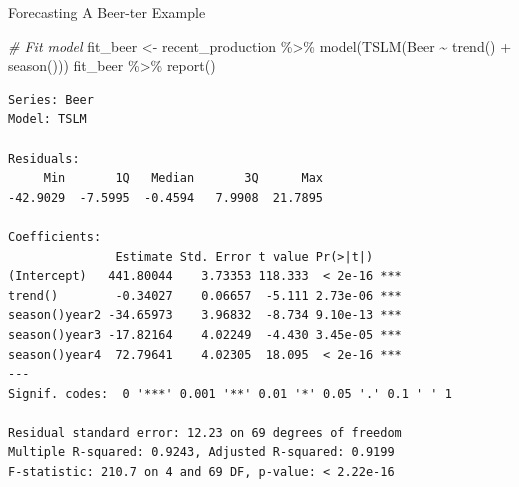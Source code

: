 \documentclass[
  ignorenonframetext,
]{beamer}
\newenvironment{Shaded}{\begin{snugshade}}{\end{snugshade}}
\newcommand{\CommentTok}[1]{\textcolor[rgb]{0.56,0.35,0.01}{\textit{#1}}}
\newcommand{\FunctionTok}[1]{\textcolor[rgb]{0.00,0.00,0.00}{#1}}
\newcommand{\NormalTok}[1]{#1}
\newcommand{\OtherTok}[1]{\textcolor[rgb]{0.56,0.35,0.01}{#1}}
\newcommand{\SpecialCharTok}[1]{\textcolor[rgb]{0.00,0.00,0.00}{#1}}
\begin{document}
\begin{frame}[fragile]{Forecasting \textbar{} \small A Beer-ter Example}
\protect\hypertarget{forecasting-a-beer-ter-example-1}{}
\tiny

\normalfont

\tiny

\begin{Shaded}
\begin{Highlighting}[]
\CommentTok{\# Fit model}
\NormalTok{fit\_beer }\OtherTok{\textless{}{-}}\NormalTok{ recent\_production }\SpecialCharTok{\%\textgreater{}\%} \FunctionTok{model}\NormalTok{(}\FunctionTok{TSLM}\NormalTok{(Beer }\SpecialCharTok{\textasciitilde{}} \FunctionTok{trend}\NormalTok{() }\SpecialCharTok{+} \FunctionTok{season}\NormalTok{()))}
\NormalTok{fit\_beer }\SpecialCharTok{\%\textgreater{}\%} \FunctionTok{report}\NormalTok{()}
\end{Highlighting}
\end{Shaded}

\begin{verbatim}
Series: Beer 
Model: TSLM 

Residuals:
     Min       1Q   Median       3Q      Max 
-42.9029  -7.5995  -0.4594   7.9908  21.7895 

Coefficients:
               Estimate Std. Error t value Pr(>|t|)    
(Intercept)   441.80044    3.73353 118.333  < 2e-16 ***
trend()        -0.34027    0.06657  -5.111 2.73e-06 ***
season()year2 -34.65973    3.96832  -8.734 9.10e-13 ***
season()year3 -17.82164    4.02249  -4.430 3.45e-05 ***
season()year4  72.79641    4.02305  18.095  < 2e-16 ***
---
Signif. codes:  0 '***' 0.001 '**' 0.01 '*' 0.05 '.' 0.1 ' ' 1

Residual standard error: 12.23 on 69 degrees of freedom
Multiple R-squared: 0.9243, Adjusted R-squared: 0.9199
F-statistic: 210.7 on 4 and 69 DF, p-value: < 2.22e-16
\end{verbatim}

\normalfont
\end{frame}
\end{document}
